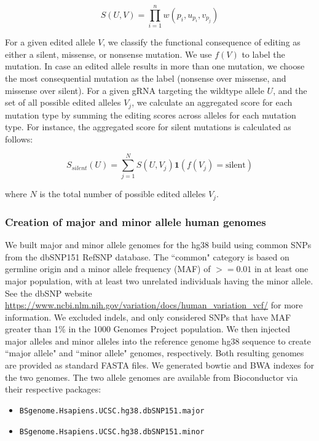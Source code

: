 \documentclass[pdftex,english,10pt]{article}
\begin{document}
{\begin{equation}
S(U,V) = \prod_{i=1}^n w({p_i}, u_{p_i}, v_{p_j})
\end{equation}

For a given edited allele $V$, we classify the functional consequence of editing as either a silent, missense, or nonsense mutation. We use $f(V)$ to label the mutation. In case an edited allele results in more than one mutation, we choose the most consequential mutation as the label (nonsense over missense, and missense over silent). For a given gRNA targeting the wildtype allele $U$,  and the set of all possible edited alleles ${V_j}$, we calculate an aggregated score for each mutation type by summing the editing scores across alleles for each mutation type. For instance, the aggregated score for silent mutations is calculated as follows:

\begin{equation}
S_{silent}(U) = \sum_{j=1}^N S(U,V_j) \mathbf{1}(f(V_j)=\text{silent})
\end{equation}

where $N$ is the total number of possible edited alleles $V_j$. 



\subsubsection*{Creation of major and minor allele human genomes}

We built major and minor allele genomes for the hg38 build using common SNPs from the dbSNP151 RefSNP database. The ``common" category is based on germline origin and a minor allele frequency (MAF) of $>=0.01$ in at least one major population, with at least two unrelated individuals having the minor allele. See the dbSNP website \url{https://www.ncbi.nlm.nih.gov/variation/docs/human_variation_vcf/} for more information. We excluded indels, and only considered SNPs that have MAF greater than 1\% in the 1000 Genomes Project population. We then injected major alleles and minor alleles into the reference genome hg38 sequence to create ``major allele" and ``minor allele" genomes, respectively. Both resulting genomes are provided as standard FASTA files. We generated bowtie and BWA indexes for the two genomes.
The two allele genomes are available from Bioconductor via their respective packages:

\begin{itemize}
\item \texttt{BSgenome.Hsapiens.UCSC.hg38.dbSNP151.major} \citep{bsgenome_major}
\item \texttt{BSgenome.Hsapiens.UCSC.hg38.dbSNP151.minor} \citep{bsgenome_minor}
\end{itemize}


}
\end{document}
